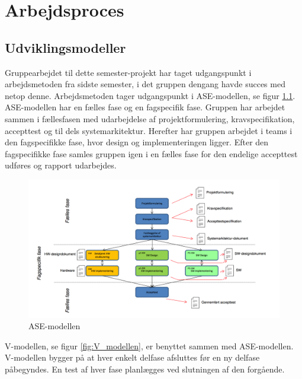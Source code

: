 
\chapter{Arbejdsproces}

\section{Udviklingsmodeller}
Gruppearbejdet til dette semester-projekt har taget udgangspunkt i arbejdsmetoden fra sidste semester, i det gruppen dengang havde succes med netop denne. Arbejdsmetoden tager udgangspunkt i ASE-modellen, se figur \ref{fig:ASE_modellen}. ASE-modellen har en fælles fase og en fagspecifik fase. Gruppen har arbejdet sammen i fællesfasen med udarbejdelse af projektformulering, kravspecifikation, accepttest og til dels systemarkitektur. Herefter har gruppen arbejdet i teams i den fagspecifikke fase, hvor design og implementeringen ligger. Efter den fagspecifikke fase samles gruppen igen i en fælles fase for den endelige accepttest udføres og rapport udarbejdes. 

\begin{figure}[h]
  \centering
    \includegraphics[width=\textwidth]{Billeder/ASE_modellen}
    \caption{ASE-modellen}
    \label{fig:ASE_modellen}
\end{figure}

V-modellen, se figur \ref{fig:V_modellen}, er benyttet sammen med ASE-modellen. V-modellen bygger på at hver enkelt delfase afsluttes før en ny delfase påbegyndes. En test af hver fase planlægges ved slutningen af den forgående. 

